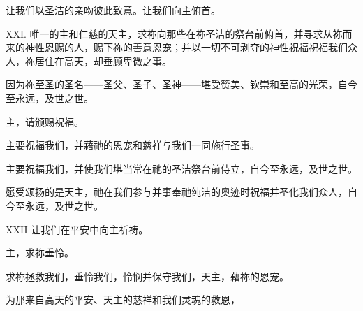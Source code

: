 \par

让我们以圣洁的亲吻彼此致意。让我们向主俯首。\par

\par

XXI. 唯一的主和仁慈的天主，求祢向那些在祢圣洁的祭台前俯首，并寻求从祢而来的神性恩赐的人，赐下祢的善意恩宠；并以一切不可剥夺的神性祝福祝福我们众人，祢居住在高天，却垂顾卑微之事。\par

\par

因为祢至圣的圣名——圣父、圣子、圣神——堪受赞美、钦崇和至高的光荣，自今至永远，及世之世。\par

\par

主，请颁赐祝福。\par

\par

主要祝福我们，并藉祂的恩宠和慈祥与我们一同施行圣事。\par

\par

主要祝福我们，并使我们堪当常在祂的圣洁祭台前侍立，自今至永远，及世之世。\par

\par

愿受颂扬的是天主，祂在我们参与并事奉祂纯洁的奥迹时祝福并圣化我们众人，自今至永远，及世之世。\par

\par

XXII 让我们在平安中向主祈祷。\par

\par

主，求祢垂怜。\par

\par

求祢拯救我们，垂怜我们，怜悯并保守我们，天主，藉祢的恩宠。\par

为那来自高天的平安、天主的慈祥和我们灵魂的救恩，\par

